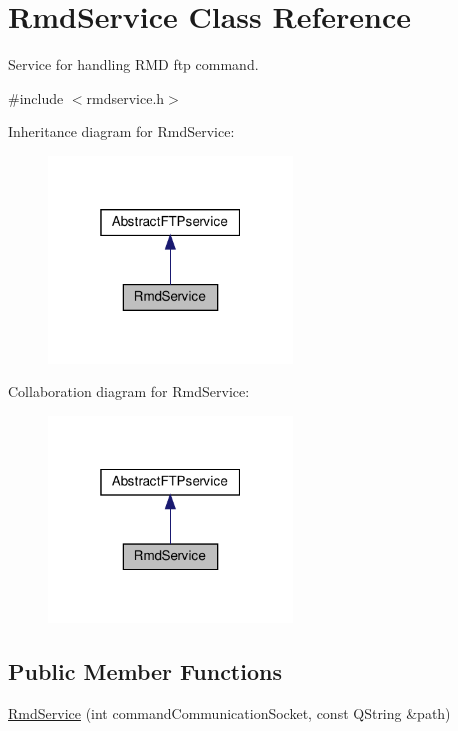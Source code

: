 \hypertarget{classRmdService}{}\section{Rmd\+Service Class Reference}
\label{classRmdService}


Service for handling R\+MD ftp command.  




{\ttfamily \#include $<$rmdservice.\+h$>$}



Inheritance diagram for Rmd\+Service\+:\nopagebreak
\begin{figure}[H]
\begin{center}
\leavevmode
\includegraphics[width=184pt]{de/dd9/classRmdService__inherit__graph}
\end{center}
\end{figure}


Collaboration diagram for Rmd\+Service\+:\nopagebreak
\begin{figure}[H]
\begin{center}
\leavevmode
\includegraphics[width=184pt]{d6/d2f/classRmdService__coll__graph}
\end{center}
\end{figure}
\subsection*{Public Member Functions}
\begin{DoxyCompactItemize}
\item 
\hyperlink{classRmdService_a1155d2f6f6c4de461e9fb79cdc681e44}{Rmd\+Service} (int command\+Communication\+Socket, const Q\+String \&path)
\end{DoxyCompactItemize}
